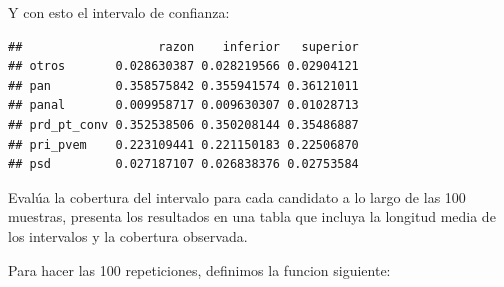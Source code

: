 \documentclass[]{article}
\newenvironment{Shaded}{\begin{snugshade}}{\end{snugshade}}
\newcommand{\DataTypeTok}[1]{\textcolor[rgb]{0.13,0.29,0.53}{#1}}
\newcommand{\FloatTok}[1]{\textcolor[rgb]{0.00,0.00,0.81}{#1}}
\newcommand{\KeywordTok}[1]{\textcolor[rgb]{0.13,0.29,0.53}{\textbf{#1}}}
\newcommand{\NormalTok}[1]{#1}
\newcommand{\OperatorTok}[1]{\textcolor[rgb]{0.81,0.36,0.00}{\textbf{#1}}}
\newcommand{\StringTok}[1]{\textcolor[rgb]{0.31,0.60,0.02}{#1}}
\begin{document}
Y con esto el intervalo de confianza:

\begin{Shaded}
\end{Shaded}

\begin{verbatim}
##                   razon    inferior   superior
## otros       0.028630387 0.028219566 0.02904121
## pan         0.358575842 0.355941574 0.36121011
## panal       0.009958717 0.009630307 0.01028713
## prd_pt_conv 0.352538506 0.350208144 0.35486887
## pri_pvem    0.223109441 0.221150183 0.22506870
## psd         0.027187107 0.026838376 0.02753584
\end{verbatim}

Evalúa la cobertura del intervalo para cada candidato a lo largo de las
100 muestras, presenta los resultados en una tabla que incluya la
longitud media de los intervalos y la cobertura observada.

Para hacer las 100 repeticiones, definimos la funcion siguiente:
\end{document}
